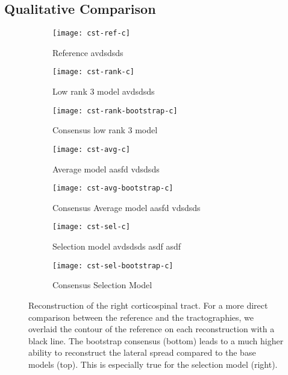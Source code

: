 \subsection{Qualitative Comparison}
\begin{figure*}[t]
	\centering
	\begin{minipage}{0.19\linewidth}
\begin{subfigure}[b]{\linewidth}
		\texttt{[image: cst-ref-c]}
		\caption{Reference {\color{white} avdsdsds} }
	\end{subfigure}
\end{minipage}
\hfil
	\begin{minipage}{0.19\linewidth}
		\begin{subfigure}[b]{\linewidth}
		\texttt{[image: cst-rank-c]}
		\caption{Low rank 3 model {\color{white} avdsdsds} }
	\end{subfigure}
	\begin{subfigure}[b]{\linewidth}
		\texttt{[image: cst-rank-bootstrap-c]}
		\caption{Consensus low rank 3 model}
\end{subfigure} 
	\end{minipage} \hfil
	\begin{minipage}{0.19\linewidth}
	\begin{subfigure}[b]{\linewidth}
		\texttt{[image: cst-avg-c]}
		\caption{Average model {\color{white} aasfd vdsdsds}}
	\end{subfigure}
	\begin{subfigure}[b]{\linewidth}
		\texttt{[image: cst-avg-bootstrap-c]}
		\caption{Consensus Average model{\color{white} aasfd vdsdsds}}
\end{subfigure} 
	\end{minipage} \hfil 
	\begin{minipage}{0.19\linewidth} 
	\begin{subfigure}[b]{\linewidth}
		\texttt{[image: cst-sel-c]}
		\caption{Selection model {\color{white} avdsdsds asdf asdf}}
	\end{subfigure}
	\begin{subfigure}[b]{\linewidth}
		\texttt{[image: cst-sel-bootstrap-c]}
		\caption{Consensus Selection Model}
\end{subfigure} 
	\end{minipage}
\caption{Reconstruction of the right corticospinal tract. For a more direct comparison
	between the reference and the tractographies, we overlaid the contour of the reference on each reconstruction with a black
	line. The bootstrap consensus (bottom) leads to a much higher ability
to reconstruct the lateral spread compared to the base models (top). This is
especially true for the selection model (right).  }
	\label{fig:CST}
\end{figure*}

